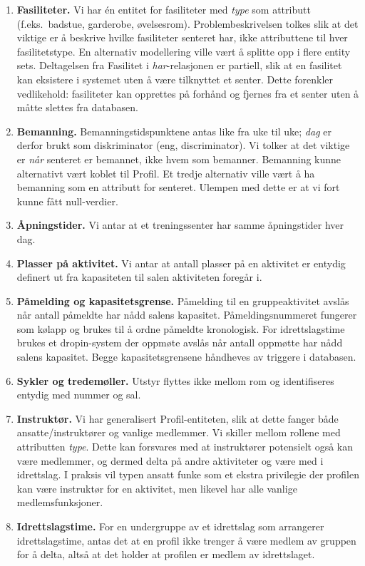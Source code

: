\begin{enumerate}
    \item \textbf{Fasiliteter.} Vi har én entitet for fasiliteter med \textit{type} som attributt (f.eks.\ badstue, garderobe, øvelsesrom). Problembeskrivelsen tolkes slik at det viktige er å beskrive hvilke fasiliteter senteret har, ikke attributtene til hver fasilitetstype. En alternativ modellering ville vært å splitte opp i flere entity sets.
    Deltagelsen fra Fasilitet i \textit{har}-relasjonen er partiell, slik at en fasilitet kan eksistere i systemet uten å være tilknyttet et senter. Dette forenkler vedlikehold: fasiliteter kan opprettes på forhånd og fjernes fra et senter uten å måtte slettes fra databasen.
    \item \textbf{Bemanning.} Bemanningstidspunktene antas like fra uke til uke; \textit{dag} er derfor brukt som diskriminator (eng, discriminator).
     Vi tolker at det viktige er \textit{når} senteret er bemannet,
      ikke hvem som bemanner. Bemanning kunne alternativt vært koblet til Profil.
      Et tredje alternativ ville vært å ha bemanning som en attributt for senteret.
      Ulempen med dette er at vi fort kunne fått null-verdier.
    \item \textbf{Åpningstider.} Vi antar at et treningssenter har samme åpningstider hver dag.
    \item \textbf{Plasser på aktivitet.} Vi antar at antall plasser på en aktivitet er entydig definert ut fra kapasiteten til salen aktiviteten foregår i.
    \item \textbf{Påmelding og kapasitetsgrense.} Påmelding til en gruppeaktivitet avslås når antall påmeldte har nådd salens kapasitet.
     Påmeldingsnummeret fungerer som kølapp og brukes til å ordne påmeldte kronologisk.
     For idrettslagstime brukes et dropin-system der oppmøte avslås når antall oppmøtte har nådd salens kapasitet.
     Begge kapasitetsgrensene håndheves av triggere i databasen.
    \item \textbf{Sykler og tredemøller.} Utstyr flyttes ikke mellom rom og identifiseres entydig med nummer og sal.
    \item \textbf{Instruktør.} Vi har generalisert Profil-entiteten, slik at dette fanger både ansatte/instruktører
     og vanlige medlemmer. Vi skiller mellom rollene med attributten \textit{type}. Dette kan forsvares med at instruktører
      potensielt også kan være medlemmer, og dermed delta på andre aktiviteter og være med i idrettslag. I praksis vil typen ansatt
       funke som et ekstra privilegie der profilen kan være instruktør for en aktivitet, men likevel har alle vanlige medlemsfunksjoner.
    \item \textbf{Idrettslagstime.} For en undergruppe av et idrettslag som arrangerer idrettslagstime, 
    antas det at en profil ikke trenger å være medlem av gruppen for å delta, altså at det holder at profilen er medlem av idrettslaget.
\end{enumerate}

